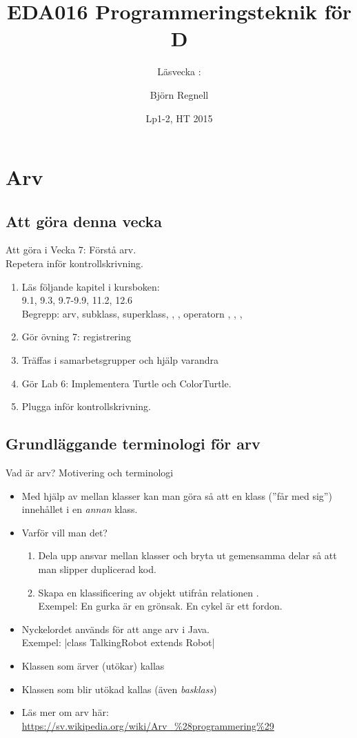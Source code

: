 \documentclass{lecturenotes}
\title[Föreläsningsanteckningar EDA016, 2015]{EDA016 Programmeringsteknik för D}
\subtitle{Läsvecka \vecka: \tema}
\author{Björn Regnell}
\institute{Datavetenskap, LTH}
\date{Lp1-2, HT 2015}
\renewcommand{\vecka}{7}
\newcommand{\tema}{Arv}
\begin{document}
\frame{\titlepage}
\setnextsection{\vecka}
\section[Vecka \vecka: \tema]{\tema}
\frame{\tableofcontents}

\subsection{Att göra denna vecka}
\begin{Slide}{Att göra i Vecka \vecka: Förstå arv. \\Repetera inför kontrollskrivning.}
\begin{enumerate}
\item Läs följande kapitel i kursboken:\\ 9.1, 9.3, 9.7-9.9, 11.2, 12.6 \\  
Begrepp: arv, subklass, superklass, ,  , operatorn , ,  ,
\item Gör övning 7: registrering
\item Träffas i samarbetsgrupper och hjälp varandra 
\item Gör Lab 6: Implementera Turtle och ColorTurtle.
\item Plugga inför  kontrollskrivning.
\end{enumerate}
\end{Slide}

\subsection{Grundläggande terminologi för arv}
\begin{Slide}{Vad är arv? Motivering och terminologi}\footnotesize
\begin{itemize}
\item Med hjälp av  mellan klasser kan man göra så att en klass  (''får med sig'') innehållet i en \textit{annan} klass.
\item Varför vill man det? 
\begin{enumerate}\footnotesize
\item Dela upp ansvar mellan klasser och bryta ut gemensamma delar så att man slipper duplicerad kod.
\item Skapa en klassificering av objekt utifrån relationen  .  \\ Exempel: En gurka är en grönsak. En cykel är ett fordon. 
\end{enumerate}
\item Nyckelordet  används för att ange arv i Java. \\ Exempel:   \code|class TalkingRobot extends Robot|
\item Klassen som ärver (utökar) kallas 
\item Klassen som blir utökad kallas  (även \textit{basklass})
\item Läs mer om arv  här: \scriptsize \url{https://sv.wikipedia.org/wiki/Arv\_\%28programmering\%29} 
\end{itemize}
\end{Slide}
\end{document}
